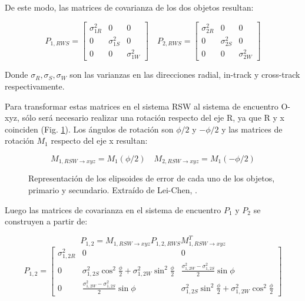 De este modo, las matrices de covarianza de los dos objetos resultan:


$$
 P_{1,RWS}=
\begin{bmatrix}
    \sigma^{2}_{1R} & 0 & 0  \\
    0 & \sigma^{2}_{1S}  & 0  \\
    0 & 0 & \sigma^{2}_{1W} 
\end{bmatrix}
\quad
 P_{2,RWS}=
\begin{bmatrix}
    \sigma^{2}_{2R} & 0 & 0  \\
    0 & \sigma^{2}_{2S}  & 0  \\
    0 & 0 & \sigma^{2}_{2W} 
\end{bmatrix}
$$

Donde $\sigma_{R}, \sigma_{S}, \sigma_{W}$ son las varianzas en las direcciones radial, in-track y cross-track respectivamente. 

Para transformar estas matrices en el sistema RSW al sistema de encuentro O-xyz, s\'olo ser\'a necesario realizar una rotaci\'on respecto del eje R, ya que R y x coinciden (Fig. \ref{fig:covarRSW}). Los \'angulos de rotaci\'on son $\phi/2$ y $-\phi/2$ y las matrices de rotaci\'on $M_{1}$ respecto del eje x resultan:

$$
M_{1,RSW \rightarrow xyz} = M_{1}(\phi/2) \quad M_{2,RSW \rightarrow xyz} = M_{1}(-\phi/2)
$$

\begin{figure}[!h]
 \centering
 \caption[Plano de encuentro y proyecci\'on del sistema RSW]{Representaci\'on de los elipsoides de error de cada uno de los objetos, primario y secundario. Extra\'ido de Lei-Chen, \citep{leichen}.}
 \label{fig:covarRSW}
\end{figure}

Luego las matrices de covarianza en el sistema de encuentro $P_{1}$ y $P_{2}$ se construyen a partir de:

$$
P_{1,2}=M_{1,RSW \rightarrow xyz} P_{1,2,RWS} M_{1,RSW \rightarrow xyz}^{T}
$$
$$
P_{1,2}= 
\begin{bmatrix}
    \sigma_{1,2 R}^{2} & 0 & 0  \\
    0 & \sigma_{1,2 S}^{2} \cos^{2}\frac{\phi}{2}+ \sigma_{1,2 W}^{2} \sin^{2}\frac{\phi}{2} & \frac{\sigma_{1,2 W}^{2}-\sigma_{1,2 S}^{2}}{2} \sin \phi \\
    0 & \frac{\sigma_{1,2 W}^{2}-\sigma_{1,2 S}^{2}}{2} \sin \phi & \sigma_{1,2 S}^{2} \sin^{2}\frac{\phi}{2}+ \sigma_{1,2 W}^{2} \cos^{2}\frac{\phi}{2} 
\end{bmatrix}
$$

